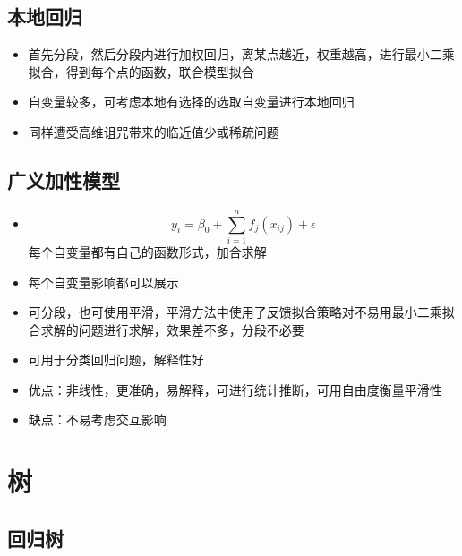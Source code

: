 \documentclass[]{book}
\providecommand{\tightlist}{%
  \setlength{\itemsep}{0pt}\setlength{\parskip}{0pt}}
\begin{document}
\hypertarget{ux672cux5730ux56deux5f52}{%
\subsection{本地回归}\label{ux672cux5730ux56deux5f52}}

\begin{itemize}
\tightlist
\item
  首先分段，然后分段内进行加权回归，离某点越近，权重越高，进行最小二乘拟合，得到每个点的函数，联合模型拟合
\item
  自变量较多，可考虑本地有选择的选取自变量进行本地回归
\item
  同样遭受高维诅咒带来的临近值少或稀疏问题
\end{itemize}

\hypertarget{ux5e7fux4e49ux52a0ux6027ux6a21ux578b}{%
\subsection{广义加性模型}\label{ux5e7fux4e49ux52a0ux6027ux6a21ux578b}}

\begin{itemize}
\tightlist
\item
  \[y_i = \beta_0 + \sum_{i = 1}^n f_j(x_{ij}) + \epsilon\] 每个自变量都有自己的函数形式，加合求解
\item
  每个自变量影响都可以展示
\item
  可分段，也可使用平滑，平滑方法中使用了反馈拟合策略对不易用最小二乘拟合求解的问题进行求解，效果差不多，分段不必要
\item
  可用于分类回归问题，解释性好
\item
  优点：非线性，更准确，易解释，可进行统计推断，可用自由度衡量平滑性
\item
  缺点：不易考虑交互影响
\end{itemize}

\hypertarget{ux6811}{%
\section{树}\label{ux6811}}

\hypertarget{ux56deux5f52ux6811}{%
\subsection{回归树}\label{ux56deux5f52ux6811}}
\end{document}
